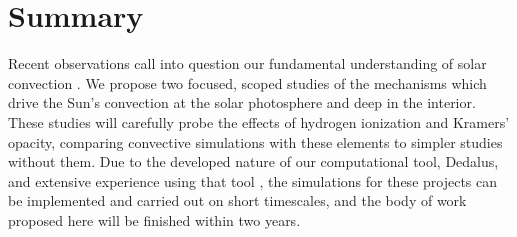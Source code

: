 \documentclass[aasms,12pt]{article}
\begin{document}
\section{Summary}
Recent observations call into question our fundamental understanding of solar
convection \citep{hanasoge&all2012, greer&all2015, hathaway&all2015}.
We propose two focused, scoped studies of the mechanisms which drive the Sun's convection at
the solar photosphere and deep in the interior.
These studies will carefully probe the effects of hydrogen ionization and Kramers' opacity, comparing
convective simulations with these elements to simpler studies without them.
Due to the developed nature of
our computational tool, Dedalus, and extensive experience using that tool \citep{anders&brown2017},
the simulations for these projects can be implemented and
carried out on short timescales, and the body of work proposed here will be finished within
two years.


\newpage


\end{document}
